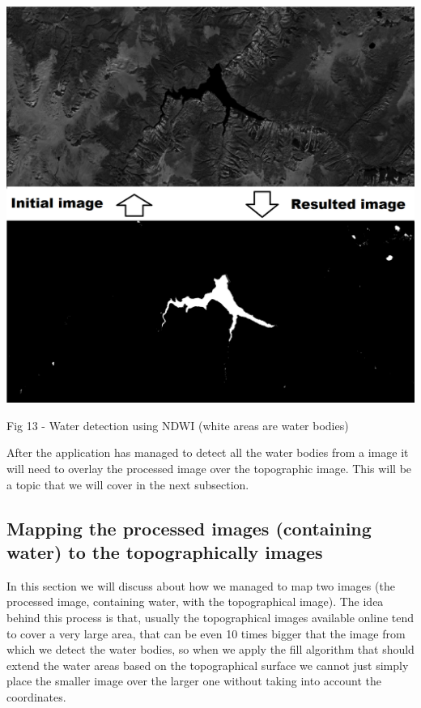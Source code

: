 \documentclass[12pt, a4paper]{report}
\begin{document}
\bigskip
\includegraphics[scale=0.4, left]{NDWI-prediction.png}
\begin{center}
Fig 13 - Water detection using NDWI (white areas are water bodies)
\end{center}
\par 

After the application has managed to detect all the water bodies from a image it will need to overlay the processed image over the topographic image. This will be a topic that we will cover in the next subsection.

\subsection{Mapping the processed images (containing water) to the topographically images}

\quad
In this section we will discuss about how we managed to map two images (the processed image, containing water, with the topographical image). The idea behind this process is that, usually the topographical images available online tend to cover a very large area, that can be even 10 times bigger that the image from which we detect the water bodies, so when we apply the fill algorithm that should extend the water areas based on the topographical surface we cannot just simply place the smaller image over the larger one without taking into account the coordinates. 
\par 
\end{document}
